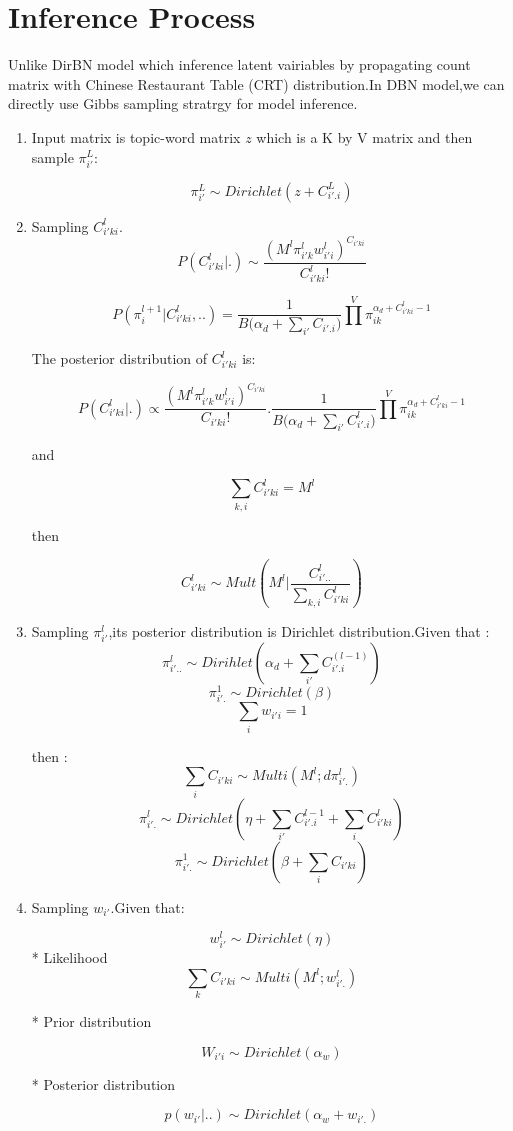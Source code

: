 \section{Inference Process}
Unlike DirBN model which inference latent vairiables by propagating count matrix with Chinese Restaurant Table (CRT) distribution.In DBN model,we can directly use Gibbs sampling stratrgy for model inference.
\begin{enumerate}
  \item Input matrix is topic-word matrix  $z$ which is a K by V matrix and then sample $\pi_{i'}^{L}$:

  $$\pi_{i'}^{L} \sim Dirichlet(z + C_{i'.i}^L)$$

  \item Sampling $C_{i'ki}^l$.
  $$P(C_{i'ki}^{l}|.) \sim \frac{(M^l \pi_{i'k}^l w_{i'i}^l)^{C_{i'ki}}}{C_{i'ki}^{l}!}$$

  $$P(\pi_i^{l+1}|C_{i'ki}^{l},..) = \frac{1}{B({\alpha_d +\sum_{i'}{C_{i'.i})}}} \prod^V \pi_{ik}^{\alpha_d+C_{i'ki}^l-1}$$

  The posterior distribution of $C_{i'ki}^{l}$ is:

  $$P(C_{i'ki}^{l}|.) \propto \frac{(M^l \pi_{i'k}^l w_{i'i}^l)^{C_{i'ki}}}{C_{i'ki}!} .\frac{1}{B({\alpha_d +\sum_{i'}{C_{i'.i}^{l})}}} \prod^V \pi_{ik}^{\alpha_d+C_{i'ki}^l-1} $$

  and

  $$\sum_{k,i}{C_{i'ki}^l} = M^l$$

  then

 $$
    {C_{i'ki}^l} \sim Mult(M^{l} | \frac{C_{i'..}^{l}}{\sum_{k,i} C_{i'ki}^{l}})
 $$


  \item Sampling $\pi_{i'}^l$,its posterior distribution is Dirichlet distribution.Given that :
  \[
    \pi_{i'..}^l \sim Dirihlet(\alpha_d +\sum_{i'}{C_{i'.i}^{(l-1)}})
  \]
  $$ \pi_{i'.}^1 \sim Dirichlet(\beta) $$
  \[
    \sum_i w_{i'i} = 1
  \]

  then :
    $$\sum_i{C_{i'ki}} \sim Multi(M^l;d\pi_{i'.}^l)$$
    $$
     \pi_{i'.}^l \sim Dirichlet(\eta + \sum_{i'} C_{i'.i}^{l-1} + \sum_i{C_{i'ki}^l})
    $$
    $$
     \pi_{i'.}^1 \sim Dirichlet(\beta +  \sum_i{C_{i'ki}})
    $$

  \item  Sampling $w_{i'}$.Given that:

  \[
    w_{i'}^l \sim Dirichlet(\eta)
  \]
  * Likelihood
  $$\sum_k{C_{i'ki}} \sim Multi(M^l;w_{i'.}^l)$$

  * Prior distribution

  $$W_{i'i} \sim Dirichlet(\alpha_w)$$

  * Posterior distribution

  $$p(w_{i'}|..) \sim Dirichlet(\alpha_w+w_{i'.})$$
\end{enumerate}

